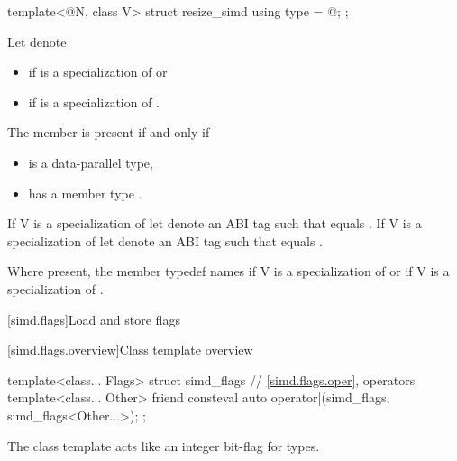 \begin{itemdecl}
template<@\simdsizetype@ N, class V> struct resize_simd { using type = @\seebelow@; };
\end{itemdecl}

\begin{itemdescr}
  \pnum Let  denote
  \begin{itemize}
    \item {} if  is a specialization of
       or
    \item {} if  is a
      specialization of .
  \end{itemize}

  \pnum
  The member  is present if and only if
  \begin{itemize}
    \item {} is a data-parallel type,
    \item {} has a member type .
  \end{itemize}

  \pnum
  If \tcode V is a specialization of  let  denote an ABI tag such that
   equals .
  If \tcode V is a specialization of  let  denote an ABI tag such
  that  equals .

  \pnum
  Where present, the member typedef  names  if \tcode V is a specialization of  or
   if \tcode V is a specialization of
  .
\end{itemdescr}

[simd.flags]{Load and store flags}

[simd.flags.overview]{Class template  overview}

\begin{codeblock}
template<class... Flags> struct simd_flags {
  // \ref{simd.flags.oper},  operators
  template<class... Other>
    friend consteval auto operator|(simd_flags, simd_flags<Other...>);
};
\end{codeblock}

\pnum
\begin{note}
The class template  acts like an integer bit-flag for types.
\end{note}

